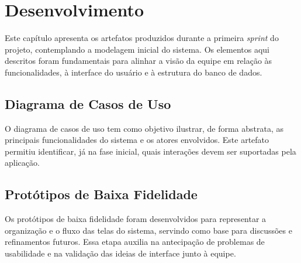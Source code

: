\chapter{Desenvolvimento}\label{cap:desenvolvimento}

Este capítulo apresenta os artefatos produzidos durante a primeira \textit{sprint} do projeto, contemplando a modelagem inicial do sistema. Os elementos aqui descritos foram fundamentais para alinhar a visão da equipe em relação às funcionalidades, à interface do usuário e à estrutura do banco de dados.

\section{Diagrama de Casos de Uso}
O diagrama de casos de uso tem como objetivo ilustrar, de forma abstrata, as principais funcionalidades do sistema e os atores envolvidos. Este artefato permitiu identificar, já na fase inicial, quais interações devem ser suportadas pela aplicação.


\section{Protótipos de Baixa Fidelidade}
Os protótipos de baixa fidelidade foram desenvolvidos para representar a organização e o fluxo das telas do sistema, servindo como base para discussões e refinamentos futuros. Essa etapa auxilia na antecipação de problemas de usabilidade e na validação das ideias de interface junto à equipe.



